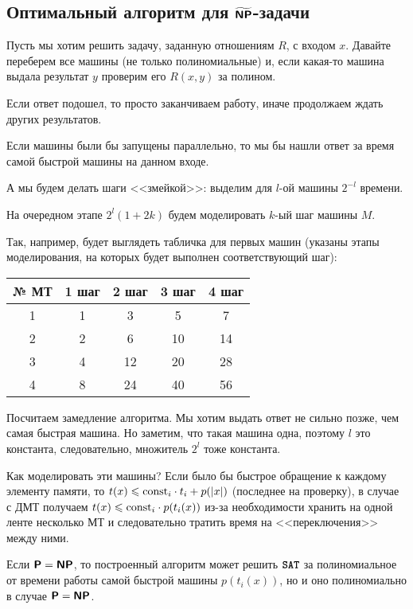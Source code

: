 \subsection{Оптимальный алгоритм для $\widetilde{\textmd{\textbf{\textsf{NP}}}}$-задачи}
Пусть мы хотим решить задачу, заданную отношениям $ R$, с входом $ x$.
Давайте переберем все машины (не только полиномиальные) и, если какая-то машина выдала результат $ y $ проверим его $ R(x, y)$ за полином.

Если ответ подошел, то просто заканчиваем работу, иначе продолжаем ждать других результатов.

Если машины были бы запущены параллельно, то мы бы нашли ответ за время самой быстрой машины на данном входе.

А мы будем делать шаги <<змейкой>>: выделим для $ l$-ой машины $ 2^{-l}$ времени. 

На очередном этапе $ 2^{l}(1 + 2k)$ будем моделировать $ k$-ый шаг машины $ M$. 

Так, например, будет выглядеть табличка для первых машин (указаны этапы моделирования, на которых будет выполнен соответствующий шаг):
\begin{center}\begin{tabular}{c|c|c|c|c}
     № МТ & 1 шаг & 2 шаг & 3 шаг & 4 шаг  \\
     \hline 
     1 & 1 & 3 & 5 & 7 \\
     2 & 2 & 6 & 10 & 14 \\
     3 & 4 & 12 & 20 & 28 \\
     4 & 8 & 24 & 40 & 56 
\end{tabular}\end{center}

Посчитаем замедление алгоритма. Мы хотим выдать ответ не сильно позже, чем самая быстрая машина. Но заметим, что такая машина одна, поэтому $ l$ это константа, следовательно, множитель $ 2^{l}$ тоже константа.

Как моделировать эти машины? Если было бы быстрое обращение к каждому элементу памяти, то $ t(x) \leqslant \textmd{const}_i \cdot t_i + p(\lvert x \rvert )$ (последнее на проверку), в случае с ДМТ получаем  $ t(x) \leqslant \textmd{const}_{i}\cdot p(t_i(x))$ из-за необходимости хранить на одной ленте несколько МТ и следовательно тратить время на <<переключения>> между ними.

\begin{note}
	Если $ \textmd{\textbf{\textsf{P}}} = \textmd{\textbf{\textsf{NP}}}$, то построенный алгоритм может решить ${\textbf{\texttt{SAT}}}$ за полиномиальное от времени работы самой быстрой машины  $ p(t_i(x))$, но и оно полиномиально в случае $ \textmd{\textbf{\textsf{P}}} = \textmd{\textbf{\textsf{NP}}}$.
\end{note}

